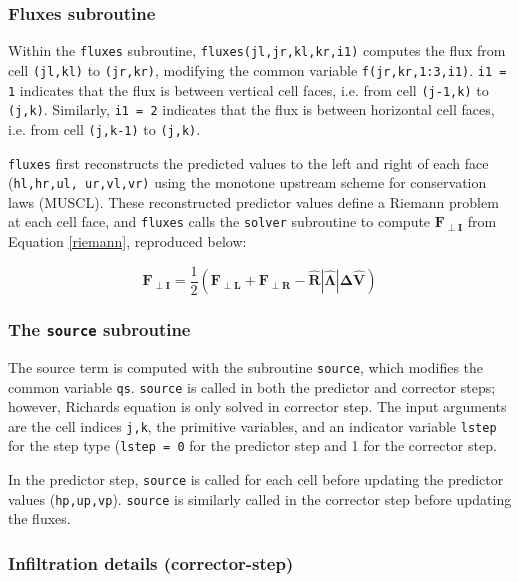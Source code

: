 \documentclass{article}
\newcommand{\code}[1]{\texttt{#1}}
\begin{document}
\subsubsection*{Fluxes subroutine}

Within the \code{fluxes} subroutine, \code{fluxes(jl,jr,kl,kr,i1)} computes the flux from cell \code{(jl,kl)} to \code{(jr,kr)}, modifying the common variable \code{f(jr,kr,1:3,i1)}. 
\code{i1 = 1} indicates that the flux is between vertical cell faces, i.e. from cell \code{(j-1,k)} to \code{(j,k)}.
Similarly, \code{i1 = 2} indicates that the flux is between horizontal cell faces, i.e. from cell \code{(j,k-1)} to \code{(j,k)}.

 
\code{fluxes}  first reconstructs the predicted values to the left and right of each face (\code{hl,hr,ul, ur,vl,vr)} using the monotone upstream scheme for conservation laws (MUSCL).  These reconstructed predictor values define a Riemann problem at each cell face, and \code{fluxes} calls the \code{solver} subroutine to compute $\mathbf{F_{\perp I}}$ from Equation \ref{riemann}, reproduced below:

\begin{equation*}
\mathbf{F_{\perp I}} =
	 \frac{1}{2} (\mathbf{F_{\perp L}} + \mathbf{F_{\perp R}} - \mathbf{\hat{R} |\hat{\Lambda}| \Delta \hat V  })
\end{equation*}


\subsubsection*{The \code{source} subroutine}

 The source term is computed with the subroutine \code{source}, which modifies the common variable \code{qs}.
  \code{source} is called in both the predictor and corrector steps; however, Richards equation is only solved in corrector step. 
 The input arguments are the  cell indices \code{j,k}, the primitive variables, and an indicator variable \code{lstep} for the step type (\code{lstep = 0} for the predictor step and 1 for the corrector step.		
 
In the predictor step, \code{source} is called for each cell before updating the predictor values (\code{hp,up,vp}).  \code{source} is similarly  called in the corrector step before updating the fluxes.

\subsubsection*{Infiltration details (corrector-step)}
\end{document}
